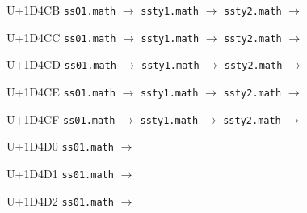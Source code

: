 \documentclass{article}
\begin{document}
\begin{substitutions}
\goodbreak

U+1D4CB  \linebreak
    \texttt{ss01.math} $\to$  \linebreak
    \texttt{ssty1.math} $\to$  \linebreak
    \texttt{ssty2.math} $\to$  

\goodbreak

U+1D4CC  \linebreak
    \texttt{ss01.math} $\to$  \linebreak
    \texttt{ssty1.math} $\to$  \linebreak
    \texttt{ssty2.math} $\to$  

\goodbreak

U+1D4CD  \linebreak
    \texttt{ss01.math} $\to$  \linebreak
    \texttt{ssty1.math} $\to$  \linebreak
    \texttt{ssty2.math} $\to$  

\goodbreak

U+1D4CE  \linebreak
    \texttt{ss01.math} $\to$  \linebreak
    \texttt{ssty1.math} $\to$  \linebreak
    \texttt{ssty2.math} $\to$  

\goodbreak

U+1D4CF  \linebreak
    \texttt{ss01.math} $\to$  \linebreak
    \texttt{ssty1.math} $\to$  \linebreak
    \texttt{ssty2.math} $\to$  

\goodbreak

U+1D4D0  \linebreak
    \texttt{ss01.math} $\to$  

\goodbreak

U+1D4D1  \linebreak
    \texttt{ss01.math} $\to$  

\goodbreak

U+1D4D2  \linebreak
    \texttt{ss01.math} $\to$  


\end{substitutions}
\end{document}
